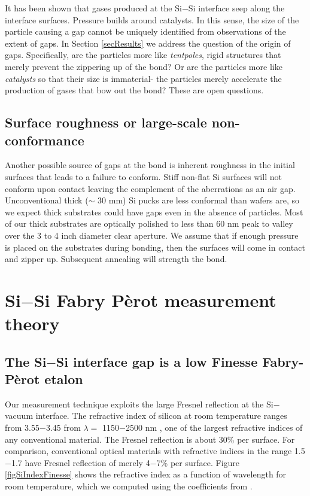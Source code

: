 \documentclass[osajnl,preprint,showpacs,superscriptaddress,12pt]{revtex4-1} %
\begin{document}
It has been shown\cite{1992JEMat..21..669M} that gases produced at the Si$-$Si interface seep along the interface surfaces.  Pressure builds around catalysts.  In this sense, the size of the particle causing a gap cannot be uniquely identified from observations of the extent of gaps.  In Section \ref{secResults} we address the question of the origin of gaps.  Specifically, are the particles more like \emph{tentpoles}, rigid structures that merely prevent the zippering up of the bond?  Or are the particles more like \emph{catalysts} so that their size is immaterial- the particles merely accelerate the production of gases that bow out the bond?  These are open questions.

\subsection{Surface roughness or large-scale non-conformance}
Another possible source of gaps at the bond is inherent roughness in the initial surfaces that leads to a failure to conform.  Stiff non-flat Si surfaces will not conform upon contact leaving the complement of the aberrations as an air gap. Unconventional thick ($\sim$ 30 mm) Si pucks are less conformal than wafers are, so we expect thick substrates could have gaps even in the absence of particles.  Most of our thick substrates are optically polished to less than 60 nm peak to valley over the 3 to 4 inch diameter clear aperture.  We assume that if enough pressure is placed on the substrates during bonding, then the surfaces will come in contact and zipper up.  Subsequent annealing will strength the bond.

\section{Si$-$Si Fabry P\`{e}rot measurement theory}
\label{secTheory}


\subsection{The Si$-$Si interface gap is a low Finesse Fabry-P\`{e}rot etalon}

Our measurement technique exploits the large Fresnel reflection \cite{2001opt4.book.....H} at the Si$-$vacuum interface.  The refractive index of silicon at room temperature ranges from 3.55$-$3.45 from $\lambda = $ 1150$-$2500 nm \cite{2006SPIE.6273E..77F}, one of the largest refractive indices of any conventional material.  The Fresnel reflection is about 30\% per surface.  For comparison, conventional optical materials with refractive indices in the range 1.5$-$1.7 have Fresnel reflection of merely 4$-$7\% per surface.  Figure \ref{figSiIndexFinesse} shows the refractive index as a function of wavelength for room temperature, which we computed using the coefficients from \cite{2006SPIE.6273E..77F}.
\end{document}
